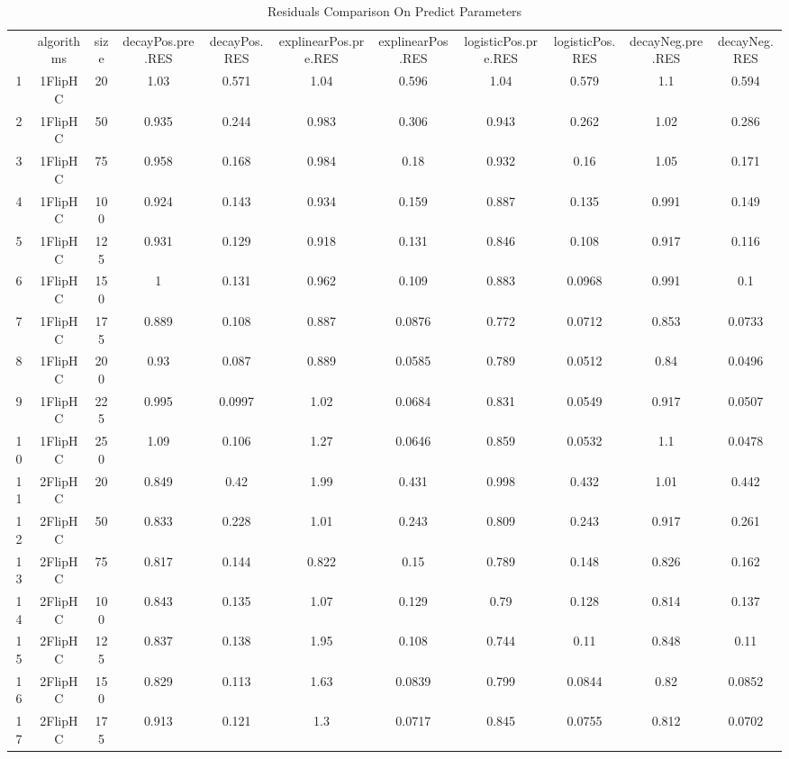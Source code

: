 \begin{table}[hbtp]
\caption{Residuals Comparison On Predict Parameters}
\centering
\begin{tabular}{|ccccccccccc|}
\hline
 & algorithms & size & decayPos.pre.RES & decayPos.RES & explinearPos.pre.RES & explinearPos.RES & logisticPos.pre.RES & logisticPos.RES & decayNeg.pre.RES & decayNeg.RES \\
   1 & 1FlipHC &   20 & 1.03 & 0.571 & 1.04 & 0.596 & 1.04 & 0.579 &  1.1 & 0.594 \\
   2 & 1FlipHC &   50 & 0.935 & 0.244 & 0.983 & 0.306 & 0.943 & 0.262 & 1.02 & 0.286 \\
   3 & 1FlipHC &   75 & 0.958 & 0.168 & 0.984 & 0.18 & 0.932 & 0.16 & 1.05 & 0.171 \\
   4 & 1FlipHC &  100 & 0.924 & 0.143 & 0.934 & 0.159 & 0.887 & 0.135 & 0.991 & 0.149 \\
   5 & 1FlipHC &  125 & 0.931 & 0.129 & 0.918 & 0.131 & 0.846 & 0.108 & 0.917 & 0.116 \\
   6 & 1FlipHC &  150 &    1 & 0.131 & 0.962 & 0.109 & 0.883 & 0.0968 & 0.991 &  0.1 \\
   7 & 1FlipHC &  175 & 0.889 & 0.108 & 0.887 & 0.0876 & 0.772 & 0.0712 & 0.853 & 0.0733 \\
   8 & 1FlipHC &  200 & 0.93 & 0.087 & 0.889 & 0.0585 & 0.789 & 0.0512 & 0.84 & 0.0496 \\
   9 & 1FlipHC &  225 & 0.995 & 0.0997 & 1.02 & 0.0684 & 0.831 & 0.0549 & 0.917 & 0.0507 \\
  10 & 1FlipHC &  250 & 1.09 & 0.106 & 1.27 & 0.0646 & 0.859 & 0.0532 &  1.1 & 0.0478 \\
  11 & 2FlipHC &   20 & 0.849 & 0.42 & 1.99 & 0.431 & 0.998 & 0.432 & 1.01 & 0.442 \\
  12 & 2FlipHC &   50 & 0.833 & 0.228 & 1.01 & 0.243 & 0.809 & 0.243 & 0.917 & 0.261 \\
  13 & 2FlipHC &   75 & 0.817 & 0.144 & 0.822 & 0.15 & 0.789 & 0.148 & 0.826 & 0.162 \\
  14 & 2FlipHC &  100 & 0.843 & 0.135 & 1.07 & 0.129 & 0.79 & 0.128 & 0.814 & 0.137 \\
  15 & 2FlipHC &  125 & 0.837 & 0.138 & 1.95 & 0.108 & 0.744 & 0.11 & 0.848 & 0.11 \\
  16 & 2FlipHC &  150 & 0.829 & 0.113 & 1.63 & 0.0839 & 0.799 & 0.0844 & 0.82 & 0.0852 \\
  17 & 2FlipHC &  175 & 0.913 & 0.121 &  1.3 & 0.0717 & 0.845 & 0.0755 & 0.812 & 0.0702 \\

\end{tabular}
\end{table}

